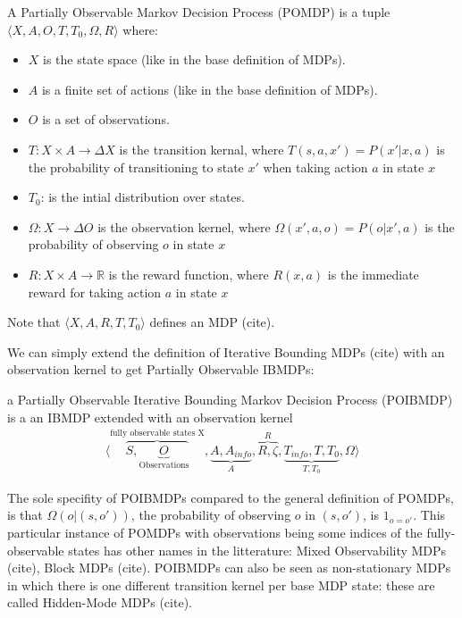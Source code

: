 \begin{definition}
A Partially Observable Markov Decision Process (POMDP) is a tuple $\langle X, A, O, T, T_0, \Omega, R\rangle$ where:
\begin{itemize}
    \item $X$ is the state space (like in the base definition of MDPs).
    \item $A$ is a finite set of actions (like in the base definition of MDPs).
    \item $O$ is a set of observations.
    \item $T: X \times A \rightarrow \Delta X$ is the transition kernal, where $T(s, a, x') = P(x'|x, a)$ is the probability of transitioning to state $x'$ when taking action $a$ in state $x$
    \item $T_0$: is the intial distribution over states. 
    \item $\Omega: X \rightarrow \Delta O$ is the observation kernel, where $\Omega(x', a, o) = P(o|x', a)$ is the probability of observing $o$ in state $x$
    \item $R: X \times A \rightarrow \mathbb{R}$ is the reward function, where $R(x, a)$ is the immediate reward for taking action $a$ in state $x$
\end{itemize}
Note that $\langle X, A, R, T, T_0 \rangle$ defines an MDP (cite).
\end{definition}

We can simply extend the definition of Iterative Bounding MDPs (cite) with an observation kernel to get Partially Observable IBMDPs:
\begin{definition} a Partially Observable Iterative Bounding Markov Decision Process (POIBMDP) is a an IBMDP extended with an observation kernel 
    \begin{align*}
        \langle \overbrace{S, \underbrace{O}_{\text{Observations}}}^{\text{fully observable states X}}, \underbrace{A, A_{info}}_{A}, \overbrace{R, \zeta}^{R}, \underbrace{T_{info}, T, T_0}_{T, T_0}, \Omega \rangle
    \end{align*}
\end{definition}

The sole specifity of POIBMDPs compared to the general definition of POMDPs, is that $\Omega(o|(s, o'))$, the probability of observing $o$ in $(s,o')$, is $1_{o=o'}$.
This particular instance of POMDPs with observations being some indices of the fully-observable states has other names in the litterature: Mixed Observability MDPs (cite), Block MDPs (cite).
POIBMDPs can also be seen as non-stationary MDPs in which there is one different transition kernel per base MDP state: these are called Hidden-Mode MDPs (cite). 

